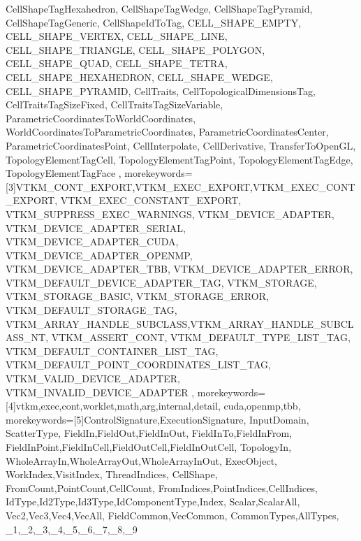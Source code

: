 {{                   CellShapeTagHexahedron,
                   CellShapeTagWedge,
                   CellShapeTagPyramid,
                   CellShapeTagGeneric,
                   CellShapeIdToTag,
                   CELL_SHAPE_EMPTY,
                   CELL_SHAPE_VERTEX,
                   CELL_SHAPE_LINE,
                   CELL_SHAPE_TRIANGLE,
                   CELL_SHAPE_POLYGON,
                   CELL_SHAPE_QUAD,
                   CELL_SHAPE_TETRA,
                   CELL_SHAPE_HEXAHEDRON,
                   CELL_SHAPE_WEDGE,
                   CELL_SHAPE_PYRAMID,
                   CellTraits,
                   CellTopologicalDimensionsTag,
                   CellTraitsTagSizeFixed,
                   CellTraitsTagSizeVariable,
                   ParametricCoordinatesToWorldCoordinates,
                   WorldCoordinatesToParametricCoordinates,
                   ParametricCoordinatesCenter,
                   ParametricCoordinatesPoint,
                   CellInterpolate,
                   CellDerivative,
                   TransferToOpenGL,
                   TopologyElementTagCell,
                   TopologyElementTagPoint,
                   TopologyElementTagEdge,
                   TopologyElementTagFace
                   },
  morekeywords={[3]VTKM_CONT_EXPORT,VTKM_EXEC_EXPORT,VTKM_EXEC_CONT_EXPORT,
                   VTKM_EXEC_CONSTANT_EXPORT,
                   VTKM_SUPPRESS_EXEC_WARNINGS,
                   VTKM_DEVICE_ADAPTER,
                   VTKM_DEVICE_ADAPTER_SERIAL,
                   VTKM_DEVICE_ADAPTER_CUDA,
                   VTKM_DEVICE_ADAPTER_OPENMP,
                   VTKM_DEVICE_ADAPTER_TBB,
                   VTKM_DEVICE_ADAPTER_ERROR,
                   VTKM_DEFAULT_DEVICE_ADAPTER_TAG,
                   VTKM_STORAGE,
                   VTKM_STORAGE_BASIC,
                   VTKM_STORAGE_ERROR,
                   VTKM_DEFAULT_STORAGE_TAG,
                   VTKM_ARRAY_HANDLE_SUBCLASS,VTKM_ARRAY_HANDLE_SUBCLASS_NT,
                   VTKM_ASSERT_CONT,
                   VTKM_DEFAULT_TYPE_LIST_TAG,
                   VTKM_DEFAULT_CONTAINER_LIST_TAG,
                   VTKM_DEFAULT_POINT_COORDINATES_LIST_TAG,
                   VTKM_VALID_DEVICE_ADAPTER,
                   VTKM_INVALID_DEVICE_ADAPTER
                   },
  morekeywords={[4]vtkm,exec,cont,worklet,math,arg,internal,detail,
                   cuda,openmp,tbb},
  morekeywords={[5]ControlSignature,ExecutionSignature,
                   InputDomain,
                   ScatterType,
                   FieldIn,FieldOut,FieldInOut,
                   FieldInTo,FieldInFrom,
                   FieldInPoint,FieldInCell,FieldOutCell,FieldInOutCell,
                   TopologyIn,
                   WholeArrayIn,WholeArrayOut,WholeArrayInOut,
                   ExecObject,
                   WorkIndex,VisitIndex,
                   ThreadIndices,
                   CellShape,
                   FromCount,PointCount,CellCount,
                   FromIndices,PointIndices,CellIndices,
                   IdType,Id2Type,Id3Type,IdComponentType,Index,
                   Scalar,ScalarAll,
                   Vec2,Vec3,Vec4,VecAll,
                   FieldCommon,VecCommon,
                   CommonTypes,AllTypes,
                   _1,_2,_3,_4,_5,_6,_7,_8,_9
                   }
}
